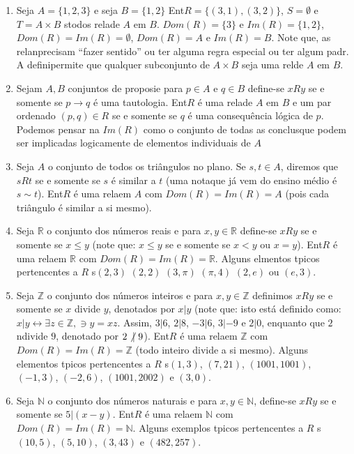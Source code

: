 \begin{enumerate}[{\bf 1.}]
\item\label{relex6} Seja $A=\{1,2,3\}$ e seja $B=\{1,2\}$ Ent\ao $R=\{(3,1),(3,2)\}$, $S=\emptyset$ e $T=A\times B$ s\ao todos rela\coes de $A$ em $B$. $Dom(R)=\{3\}$ e $Im(R)=\{1,2\}$, $Dom(R)=Im(R)=\emptyset$, $Dom(R)=A$ e $Im(R)=B$. Note que, as rela\coes n\ao precisam ``fazer sentido'' ou ter alguma regra especial ou ter algum padr\aoi. A defini\cao permite que qualquer subconjunto de $A\times B$ seja uma rel\cao de $A$ em $B$.

\item\label{relex7} Sejam $A,B$ conjuntos de proposi\coes e para $p\in A$ e $q\in B$ define-se $xRy$ se e somente se $p\to q$ \'e uma tautologia. Ent\ao $R$ \'e uma rela\cao de $A$ em $B$ e um par ordenado $(p,q)\in R$ se e somente se $q$ \'e uma consequ\^encia l\'ogica de $p$. Podemos pensar na $Im(R)$ como o conjunto de todas as conclus\oes que podem ser implicadas logicamente de elementos individuais de $A$ 

\item\label{relex8} Seja $A$ o conjunto de todos os tri\^angulos no plano. Se $s,t\in A$, diremos que $sRt$ se e somente se $s$ \'e similar a $t$ (uma nota\cao que j\'a vem do ensino m\'edio \'e $s\sim t$). Ent\ao $R$ \'e uma rela\cao em $A$ com $Dom(R)=Im(R)=A$ (pois cada tri\^angulo \'e similar a si mesmo).

\item\label{relex9} Seja $\mathbb{R}$ o conjunto dos n\'umeros reais e para $x,y\in\mathbb{R}$ define-se $xRy$ se e somente se $x\leq y$ (note que: $x\leq y$ se e somente se $x<y$ ou $x=y$). Ent\ao $R$ \'e uma rela\cao em $\mathbb{R}$ com $Dom(R)=Im(R)=\mathbb{R}$. Alguns elmentos t\ih picos pertencentes a $R$ s\ao $(2,3)$ $(2,2)$ $(3,\pi)$ $(\pi,4)$ $(2,e)$ ou $(e,3)$.
 
\item\label{relex10} Seja $\mathbb{Z}$ o conjunto dos n\'umeros inteiros e para $x,y\in\mathbb{Z}$ definimos $xRy$ se e somente se $x$ divide $y$, denotados por $x|y$ (note que: isto est\'a definido como: $x|y\leftrightarrow\exists z\in \mathbb{Z},\ni y=xz$. Assim, $3|6$, $2|8$, $-3|6$, $3|-9$ e $2|0$, enquanto que $2$ n\ao divide $9$, denotado por $2\not\vert\textrm{ } 9$). Ent\ao $R$ \'e uma rela\cao em $\mathbb{Z}$ com $Dom(R)=Im(R)=\mathbb{Z}$ (todo inteiro divide a si mesmo). Alguns elementos t\ih picos pertencentes a $R$ s\ao $(1,3)$, $(7,21)$, $(1001,1001)$, $(-1,3)$, $(-2,6)$, $(1001,2002)$ e $(3,0)$.

\item\label{relex11} Seja $\mathbb{N}$ o conjunto dos n\'umeros naturais e para $x,y\in\mathbb{N}$, define-se $xRy$ se e somente se $5|(x-y)$. Ent\ao $R$ \'e uma rela\cao em $\mathbb{N}$ com $Dom(R)=Im(R)=\mathbb{N}$. Alguns exemplos t\ih picos pertencentes a $R$ s\ao $(10,5)$, $(5,10)$, $(3,43)$ e $(482,257)$. 
\end{enumerate}

